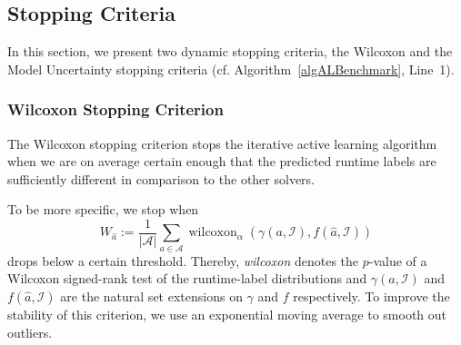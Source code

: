 \documentclass[runningheads]{llncs}
\begin{document}


\subsection{Stopping Criteria}
\label{sec:main-stopping}


In this section, we present two dynamic stopping criteria, the Wilcoxon and the Model Uncertainty stopping criteria (cf. Algorithm~\ref{algALBenchmark}, Line~1). 


\subsubsection{Wilcoxon Stopping Criterion}
The Wilcoxon stopping criterion stops the iterative active learning algorithm when we are on average certain enough that the predicted runtime labels are sufficiently different in comparison to the other solvers.


To be more specific, we stop when
\begin{equation}
  W_{\hat{a}} := \frac{1}{\left\lvert \mathcal{A} \right\rvert} \sum_{a \in \mathcal{A}} \operatorname{wilcoxon}_{\alpha}\!\left(\gamma\!\left(a, \mathcal{I}\right), f\!\left(\hat{a}, \mathcal{I}\right) \right)
\end{equation}
drops below a certain threshold.
Thereby, \emph{wilcoxon} denotes the $p$-value of a Wilcoxon signed-rank test of the runtime-label distributions and $\gamma\!\left(a, \mathcal{I}\right)$ and $f\!\left(\hat{a}, \mathcal{I}\right)$ are the natural set extensions on $\gamma$ and $f$ respectively.
To improve the stability of this criterion, we use an exponential moving average to smooth out outliers.
\end{document}
